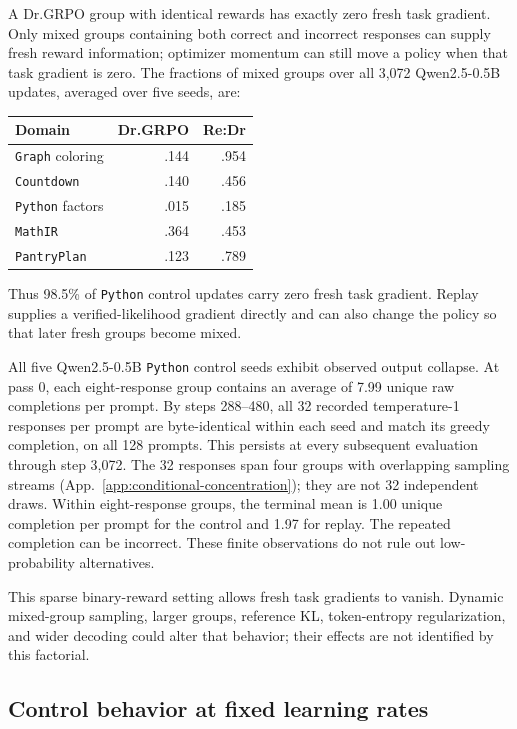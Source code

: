 \documentclass{article}
\newcommand{\1}{\mathbf 1}
\theoremstyle{remark}
\theoremstyle{definition}
\theoremstyle{plain}
\begin{document}
A Dr.GRPO group with identical rewards has exactly zero fresh task gradient.
Only mixed groups containing both correct and incorrect responses can
supply fresh reward information; optimizer momentum can still move a
policy when that task gradient is zero. The fractions of mixed groups
over all 3,072 Qwen2.5-0.5B updates, averaged over five seeds, are:

\begin{center}
\small
\begin{tabular}{@{}lrr@{}}
\toprule
\textbf{Domain} & \textbf{Dr.GRPO} & \textbf{Re:Dr} \\
\midrule
\texttt{Graph} coloring & .144 & .954 \\
\texttt{Countdown} & .140 & .456 \\
\texttt{Python} factors & .015 & .185 \\
\texttt{MathIR} & .364 & .453 \\
\texttt{PantryPlan} & .123 & .789 \\
\bottomrule
\end{tabular}
\end{center}

Thus 98.5\% of \texttt{Python} control updates carry zero fresh task gradient.
Replay supplies a verified-likelihood gradient directly and can also
change the policy so that later fresh groups become mixed.

All five Qwen2.5-0.5B \texttt{Python} control seeds exhibit observed output collapse.
At pass 0, each eight-response group contains an average of 7.99 unique raw
completions per prompt. By steps 288--480, all 32 recorded temperature-1
responses per prompt are byte-identical within each seed and match its greedy
completion, on all 128 prompts. This persists at every subsequent evaluation
through step 3,072. The 32 responses span four groups with overlapping sampling
streams (App.~\ref{app:conditional-concentration}); they are not 32 independent
draws. Within eight-response groups, the terminal mean is 1.00 unique
completion per prompt for the control and 1.97 for replay. The repeated
completion can be incorrect. These finite observations do not rule out
low-probability alternatives.

This sparse binary-reward setting allows fresh task gradients to vanish.
Dynamic mixed-group sampling, larger groups, reference KL, token-entropy
regularization, and wider decoding could alter that behavior; their effects
are not identified by this factorial.

\subsection{Control behavior at fixed learning rates}
\label{app:control-learning-audit}
\end{document}

